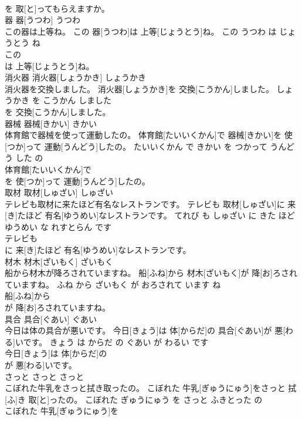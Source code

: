 \documentclass[8pt]{extreport}
\begin{document}
\begin{CJK}{UTF8}{min}
\\	を 取[と]ってもらえますか。			
\\	器	器[うつわ]	うつわ	
\\	この器は上等ね。	この 器[うつわ]は 上等[じょうとう]ね。	この うつわ は じょうとう ね	
\\	この
\\	は 上等[じょうとう]ね。			
\\	消火器	消火器[しょうかき]	しょうかき	
\\	消火器を交換しました。	消火器[しょうかき]を 交換[こうかん]しました。	しょうかき を こうかん しました	
\\	を 交換[こうかん]しました。			
\\	器械	器械[きかい]	きかい	
\\	体育館で器械を使って運動したの。	体育館[たいいくかん]で 器械[きかい]を 使[つか]って 運動[うんどう]したの。	たいいくかん で きかい を つかって うんどう した の	
\\	体育館[たいいくかん]で
\\	を 使[つか]って 運動[うんどう]したの。			
\\	取材	取材[しゅざい]	しゅざい	
\\	テレビも取材に来たほど有名なレストランです。	テレビも 取材[しゅざい]に 来[き]たほど 有名[ゆうめい]なレストランです。	てれび も しゅざい に きた ほど ゆうめい な れすとらん です	
\\	テレビも
\\	に 来[き]たほど 有名[ゆうめい]なレストランです。			
\\	材木	材木[ざいもく]	ざいもく	
\\	船から材木が降ろされていますね。	船[ふね]から 材木[ざいもく]が 降[お]ろされていますね。	ふね から ざいもく が おろされて います ね	
\\	船[ふね]から
\\	が 降[お]ろされていますね。			
\\	具合	具合[ぐあい]	ぐあい	
\\	今日は体の具合が悪いです。	今日[きょう]は 体[からだ]の 具合[ぐあい]が 悪[わる]いです。	きょう は からだ の ぐあい が わるい です	
\\	今日[きょう]は 体[からだ]の
\\	が 悪[わる]いです。			
\\	さっと	さっと	さっと	
\\	こぼれた牛乳をさっと拭き取ったの。	こぼれた 牛乳[ぎゅうにゅう]をさっと 拭[ふ]き 取[と]ったの。	こぼれた ぎゅうにゅう を さっと ふきとった の	
\\	こぼれた 牛乳[ぎゅうにゅう]を

\end{CJK}
\end{document}
